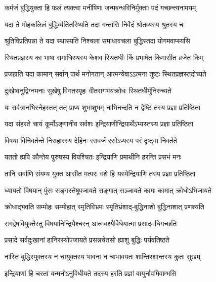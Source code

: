 \twolineshloka
{कर्मजं बुद्धियुक्ता हि फलं त्यक्त्वा मनीषिणः}
{जन्मबन्धविनिर्मुक्ताः पदं गच्छन्त्यनामयम्}%

\twolineshloka
{यदा ते मोहकलिलं बुद्धिर्व्यतितरिष्यति}
{तदा गन्तासि निर्वेदं श्रोतव्यस्य श्रुतस्य च}%

\twolineshloka
{श्रुतिविप्रतिपन्ना ते यदा स्थास्यति निश्चला}
{समाधावचला बुद्धिस्तदा योगमवाप्स्यसि}%

\twolineshloka
{स्थितप्रज्ञस्य का भाषा समाधिस्थस्य केशव}
{स्थितधीः किं प्रभाषेत किमासीत व्रजेत किम्}%

\twolineshloka
{प्रजहाति यदा कामान् सर्वान् पार्थ मनोगतान्}
{आत्मन्येवाऽऽत्मना तुष्टः स्थितप्रज्ञस्तदोच्यते}%

\twolineshloka
{दुःखेष्वनुद्विग्नमनाः सुखेषु विगतस्पृहः}
{वीतरागभयक्रोधः स्थितधीर्मुनिरुच्यते}%

\twolineshloka
{यः सर्वत्रानभिस्नेहस्तत् तत् प्राप्य शुभाशुभम्}
{नाभिनन्दति न द्वेष्टि तस्य प्रज्ञा प्रतिष्ठिता}%

\twolineshloka
{यदा संहरते चायं कूर्मोऽङ्गानीव सर्वशः}
{इन्द्रियाणीन्द्रियार्थेऽभ्यस्तस्य प्रज्ञा प्रतिष्ठिता}%

\twolineshloka
{विषया विनिवर्तन्ते निराहारस्य देहिनः}
{रसवर्जं रसोऽप्यस्य परं दृष्ट्वा निवर्तते}%

\twolineshloka
{यततो ह्यपि कौन्तेय पुरुषस्य विपश्चितः}
{इन्द्रियाणि प्रमाथीनि हरन्ति प्रसभं मनः}%

\twolineshloka
{तानि सर्वाणि संयम्य युक्त आसीत मत्परः}
{वशे हि यस्येन्द्रियाणि तस्य प्रज्ञा प्रतिष्ठिता}%

\twolineshloka
{ध्यायतो विषयान् पुंसः सङ्गस्तेषूपजायते}
{सङ्गात् सञ्जायते कामः कामात् क्रोधोऽभिजायते}%

\twolineshloka
{क्रोधाद्भवति सम्मोहः सम्मोहात् स्मृतिविभ्रमः}
{स्मृतिभ्रंशाद्-बुद्धिनाशो बुद्धिनाशात् प्रणश्यति}%

\twolineshloka
{रागद्वेषवियुक्तैस्तु विषयानिन्द्रियैश्चरन्}
{आत्मवश्यैर्विधेयात्मा प्रसादमधिगच्छति}%

\twolineshloka
{प्रसादे सर्वदुःखानां हानिरस्योपजायते}
{प्रसन्नचेतसो ह्याशु बुद्धिः पर्यवतिष्ठते}%

\twolineshloka
{नास्ति बुद्धिरयुक्तस्य न चायुक्तस्य भावना}
{न चाभावयतः शान्तिरशान्तस्य कुतः सुखम्}%

\twolineshloka
{इन्द्रियाणां हि चरतां यन्मनोऽनुविधीयते}
{तदस्य हरति प्रज्ञां वायुर्नावमिवाम्भसि}%

